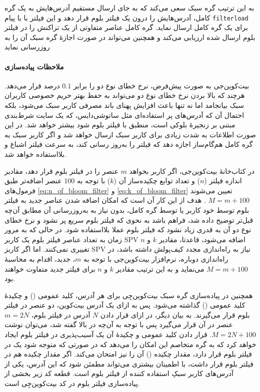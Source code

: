 به این ترتیب گره سبک سعی می‌کند که به جای ارسال مستقیم آدرس‌هایش به یک گره کامل، آدرس‌هایش را درون یک فیلتر بلوم قرار دهد و این فیلتر با با پیام \texttt{filterload} برای یک گره کامل ارسال نماید. گره کامل عناصر متفاوتی از یک تراکنش را در فیلتر بلوم ارسال شده ارزیابی می‌کند و همچنین می‌تواند در صورت اجازهٔ گره سبک آن را به روزرسانی نماید

\paragraph{ملاحظات پیاده‌سازی}
بیت‌کوین‌جی\cite{bitcoinj} به صورت پیش‌فرض، نرخ خطای نوع دو را برابر $0.1$ درصد قرار می‌دهد. هرچند که بالا بردن نرخ خطای نوع دو می‌تواند به حفظ بهتر حریم خصوصی کاربران سبک بیانجامد اما نه تنها باعث افزایش پهنای باند مصرفی کاربر سبک می‌شود، بلکه احتمال آن که آدرس‌های پر استفاده‌ای مثل 
ساتوشی‌دایس،
که یک سایت شرط‌بندی مبتنی بر زنجیرهٔ بلوکی است، منطبق با فیلتر بلوم شود بیشتر خواهد شد. در این صورت اطلاعات به شدت زیادی برای کاربر سبک ارسال خواهد شد و اگر کاربر سبک به گره کامل هم‌گام‌ساز اجازه دهد که فیلتر را به‌روز رسانی کند، به سرعت فیلتر اشباع و بلااستفاده خواهد شد.
 
در کتاب‌خانهٔ بیت‌کوین‌جی، اگر کاربر بخواهد $m$ عنصر را در فیلتر بلوم قرار دهد، مقادیر اندازه فیلتر ($n$) و تعداد توابع چکیده‌ساز آن ($k$) با توجه به $100$ عنصر اضافه‌تر طبق فرمول‌های \eqref{eq:n_of_bloom_filter} و \eqref{eq:k_of_bloom_filter} تعیین می‌شوند 
$M=m+100$ \cite{Gervais2014}.
 هدف از این کار آن است که امکان اضافه شدن عناصر جدید به فیلتر بلوم توسط خود کاربر یا توسط گره کامل، بدون نیاز به به‌روزرسانی آن مطابق آن‌چه قبل‌تر توضیح داده شد، فراهم باشد به نحوی که فیلتر بلوم سریع پر نشود و نرخ خطای نوع دو آن به قدری زیاد نشود که فیلتر بلوم عملا بلااستفاده شود. در حالی که به مرور زمان به تعداد عناصر فیلتر بلوم یک کاربر SPV اضافه می‌شود، قاعدتا، مقادیر $k$ و $n$ تغییری نمی‌کنند. اما اگر کاربز SPV نیاز به راه‌اندازی مجدد کیف‌پولش داشته باشد، در راه‌اندازی دوباره، نرم‌افزار بیت‌کوین‌جی با توجه به $m$، جدید، اقدام به محاسبهٔ $M=m+100$ می‌نماید و به این ترتیب مقادیر  $k$ و $n$ برای فیلتر جدید متفاوت خواهند بود.
 
همچنین در پیاده‌سازی گره سبک بیت‌کوین‌جِی برای هر آدرس، کلید عمومی () و چکیدهٔ کلید عمومی () گذاشته می‌شود. پس به ازای یک آدرس بیت‌کوین، دو عنصر در فیلتر بلوم قرار می‌گیرند. به بیان دیگر، در ازای قرار دادن $N$ آدرس در فیلتر بلوم، $m=2N$ عنصر در آن قرار می‌گیرد پس با توجه به آن‌چه در بالا گفته شد، می‌توان نوشت $M=2N+100$. قرار دادن کلید عمومی و چکیدهٔ آن یک آسیب‌پذیری در فیلتر بلوم ایجاد خواهد کرد که به گره متخاصم این امکان را می‌دهد که در صورتی که متوجه شود یک  در فیلتر بلوم قرار دارد، مقدار چکیده () آن  را نیز امتحان می‌کند. اگر مقدار چکیده هم در فیلتر بلوم قرار داشت، با اطمینان بیشتری می‌تواند مطمئن شود که این آدرس، یکی از آدرس‌های کاربر سبکِ استفاده کننده از فیلتر بلوم است. قطعه کد زیر بخشی از پیاده‌سازی فیلتر بلوم در کد بیت‌کوین‌جِی است\cite{bitcoinj_BloomFilter}.


